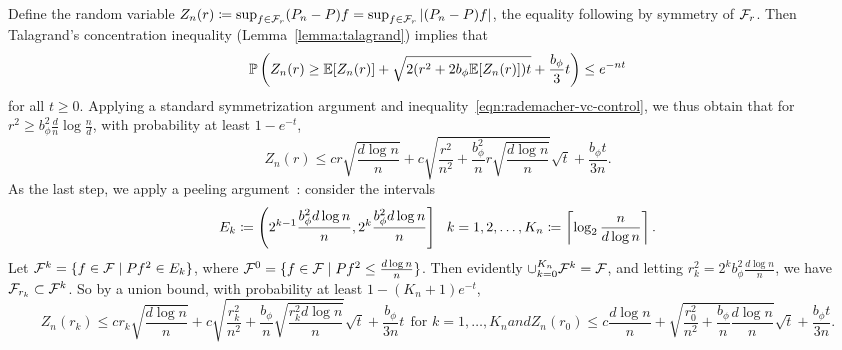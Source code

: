 \documentclass{article}
\newcommand{\radphi}{b_{\phi}}
\begin{document}
Define the random variable $Z_n(r) \coloneqq
\sup_{f \in \mathcal{F}_r} (P_n - P) f = \sup_{f \in \mathcal{F}_r} |(P_n - P) f|$, the
equality following by symmetry of $\mathcal{F}_r$. Then
Talagrand's concentration inequality (Lemma~\ref{lemma:talagrand}) implies
that
\begin{equation*}
  \P\left(Z_n(r) \ge \E[Z_n(r)]
  + \sqrt{2 (r^2 + 2 \radphi \E[Z_n(r)]) t}
  + \frac{\radphi}{3} t \right) \le e^{-nt}
\end{equation*}
for all $t \ge 0$.  Applying a standard symmetrization argument and
inequality~\eqref{eqn:rademacher-vc-control},
we thus obtain that for $r^2 \ge \radphi^2 \frac{d}{n} \log \frac{n}{d}$,
with probability at least $1 - e^{-t}$,
\begin{equation*}
  Z_n(r) \le c r \sqrt{\frac{d \log n}{n}}
  + c \sqrt{\frac{r^2}{n^2} + \frac{\radphi^2}{n}
    r \sqrt{\frac{d \log n}{n}}} \sqrt{t}
  + \frac{\radphi t}{3n}.
\end{equation*}
As the last step, we apply a peeling
argument~\cite{Wainwright19, vandeGeer00}: consider the intervals
\begin{equation*}
  E_k \defeq \openleft{2^{k-1}\frac{\radphi^2 d \log n}{n}}{
    2^k \frac{\radphi^2 d \log n}{n}}
  ~~
  k = 1, 2, \ldots, K_n \defeq \ceil{\log_2 \frac{n}{d \log n}}.
\end{equation*}
Let $\mathcal{F}^k = \{f \in \mathcal{F} \mid  Pf^2 \in E_k\}$,
where $\mathcal{F}^0 = \{f \in \mathcal{F} \mid Pf^2 \le \frac{d \log n}{n}\}$. Then
evidently $\cup_{k = 0}^{K_n} \mathcal{F}^k = \mathcal{F}$, and letting
$r_k^2 = 2^k \radphi^2 \frac{d \log n}{n}$, we have
$\mathcal{F}_{r_k} \subset \mathcal{F}^k$. So by a union bound,
with probability at least $1 - (K_n + 1)e^{-t}$,
\begin{subequations}
  \label{eqn:peeling-inequalities}
  \begin{equation}
    Z_n(r_k) \le c r_k \sqrt{\frac{d \log n}{n}} + c
    \sqrt{\frac{r_k^2}{n^2} + \frac{\radphi}{n}
      \sqrt{\frac{r_k^2 d \log n}{n}}} \sqrt{t} + \frac{\radphi}{3n} t
    ~~ \mbox{for~} k = 1, \ldots, K_n
  \end{equation}
  and
  \begin{equation}
    Z_n(r_0) \le c \frac{d \log n}{n}
    + \sqrt{\frac{r_0^2}{n^2} + \frac{\radphi}{n}
      \frac{d \log n}{n}} \sqrt{t} + \frac{\radphi t}{3n}.
  \end{equation}
\end{subequations}
\end{document}
